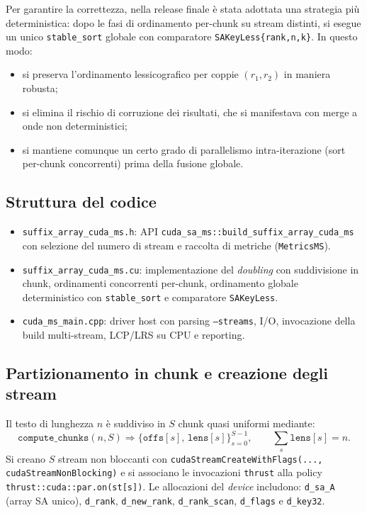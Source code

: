 		Per garantire la correttezza, nella release finale è stata adottata una strategia più deterministica: dopo le fasi di ordinamento per-chunk su stream distinti, si esegue un unico \texttt{stable\_sort} globale con comparatore \texttt{SAKeyLess\{rank,n,k\}}.
		In questo modo:
		\begin{itemize}
			\item si preserva l’ordinamento lessicografico per coppie $(r_1,r_2)$ in maniera robusta;
			\item si elimina il rischio di corruzione dei risultati, che si manifestava con merge a onde non deterministici;
			\item si mantiene comunque un certo grado di parallelismo intra-iterazione (sort per-chunk concorrenti) prima della fusione globale.
		\end{itemize}
		
		\subsection{Struttura del codice}
			\begin{itemize}
				\item \texttt{suffix\_array\_cuda\_ms.h}: API \texttt{cuda\_sa\_ms::build\_suffix\_array\_cuda\_ms} con selezione del numero di stream e raccolta di metriche (\texttt{MetricsMS}).
				\item \texttt{suffix\_array\_cuda\_ms.cu}: implementazione del \emph{doubling} con suddivisione in chunk, ordinamenti concorrenti per-chunk, ordinamento globale deterministico con \texttt{stable\_sort} e comparatore \texttt{SAKeyLess}.
				\item \texttt{cuda\_ms\_main.cpp}: driver host con parsing \texttt{--streams}, I/O, invocazione della build multi-stream, LCP/LRS su CPU e reporting.
			\end{itemize}
		
		\subsection{Partizionamento in chunk e creazione degli stream}
			Il testo di lunghezza $n$ è suddiviso in $S$ chunk quasi uniformi mediante:
			\[
				\texttt{compute\_chunks}(n,S) \Rightarrow \{\texttt{offs}[s],\, \texttt{lens}[s]\}_{s=0}^{S-1},\qquad
				\sum_s \texttt{lens}[s] = n.
			\]
			Si creano $S$ stream non bloccanti con \texttt{cudaStreamCreateWithFlags(..., cudaStreamNonBlocking)} e si associano le invocazioni \texttt{thrust} alla policy \texttt{thrust::cuda::par.on(st[s])}.
			Le allocazioni del \emph{device} includono: \texttt{d\_sa\_A} (array SA unico), \texttt{d\_rank}, \texttt{d\_new\_rank}, \texttt{d\_rank\_scan}, \texttt{d\_flags} e \texttt{d\_key32}.
		
